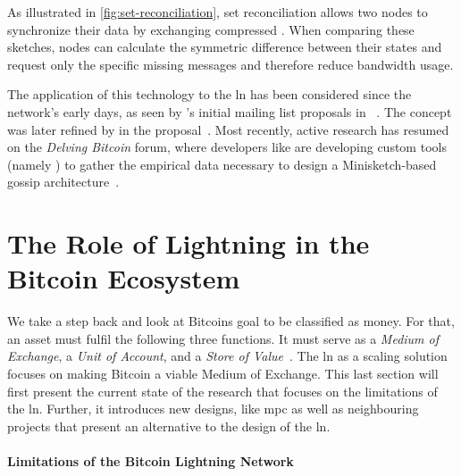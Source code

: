 As illustrated in \autoref{fig:set-reconciliation}, set reconciliation allows two nodes 
to synchronize their data by exchanging compressed . 
When comparing these sketches, nodes can calculate the symmetric difference 
between their states and request only the specific missing messages and therefore reduce bandwidth usage.

The application of this technology to the \gls{ln} has been considered since the 
network's early days, as seen by \citeauthor{russel_diyhplus_2018}'s initial 
mailing list proposals in \citeyear{russel_diyhplus_2018}~\cite{russel_diyhplus_2018}. 
The concept was later refined by \citeauthor{myers_magical_2022} in the  proposal~\cite{myers_magical_2022}. 
Most recently, active research has resumed on the \textit{Delving Bitcoin} forum, 
where developers like \citeauthor{harvey-buschel_jharveyb_2026} are developing custom tools (namely ) 
to gather the empirical data necessary to design a Minisketch-based gossip architecture~\cite{harvey-buschel_jharveyb_2026}.


\section{The Role of Lightning in the Bitcoin Ecosystem}
\label{sec:the-role-of-ln}

We take a step back and look at Bitcoins goal to be classified as money.
For that, an asset must fulfil the following three functions. 
It must serve as a \textit{Medium of Exchange}, a \textit{Unit of Account}, and a \textit{Store of Value}~\cite{jevons_money_1875}.
The \gls{ln} as a scaling solution focuses on making Bitcoin a viable Medium of Exchange.
This last section will first present the current state of the research that focuses on the limitations of the \gls{ln}.
Further, it introduces new designs, like \gls{mpc} as well as neighbouring projects 
that present an alternative to the design of the \gls{ln}.


\paragraph{Limitations of the Bitcoin Lightning Network}

